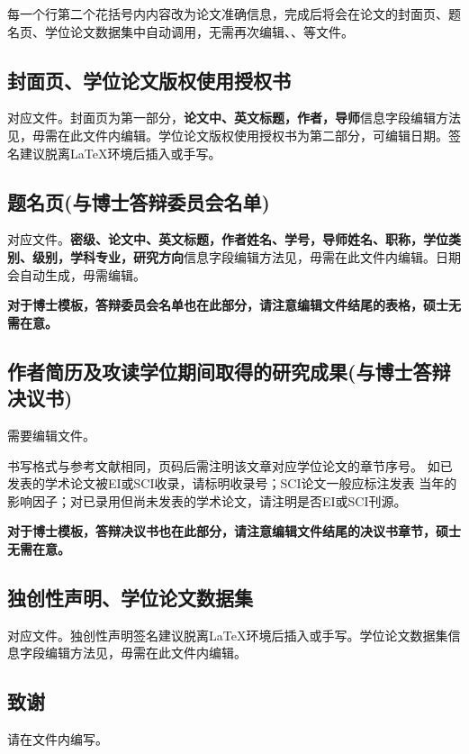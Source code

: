 每一个行第二个花括号内内容改为论文准确信息，完成后将会在论文的封面页、题名页、学位论文数据集中自动调用，无需再次编辑、、等文件。

\subsection{封面页、学位论文版权使用授权书}
对应文件。封面页为第一部分，\textbf{论文中、英文标题，作者，导师}信息字段编辑方法见，毋需在此文件内编辑。学位论文版权使用授权书为第二部分，可编辑日期。签名建议脱离\LaTeX{}环境后插入或手写。

\subsection{题名页(与博士答辩委员会名单)}
对应文件。\textbf{密级、论文中、英文标题，作者姓名、学号，导师姓名、职称，学位类别、级别，学科专业，研究方向}信息字段编辑方法见，毋需在此文件内编辑。日期会自动生成，毋需编辑。

\textbf{对于博士模板，答辩委员会名单也在此部分，请注意编辑文件结尾的表格，硕士无需在意。}

\subsection{作者简历及攻读学位期间取得的研究成果(与博士答辩决议书)}
需要编辑文件。

书写格式与参考文献相同，页码后需注明该文章对应学位论文的章节序号。
如已发表的学术论文被EI或SCI收录，请标明收录号；SCI论文一般应标注发表
当年的影响因子；对已录用但尚未发表的学术论文，请注明是否EI或SCI刊源。

\textbf{对于博士模板，答辩决议书也在此部分，请注意编辑文件结尾的决议书章节，硕士无需在意。}

\subsection{独创性声明、学位论文数据集}
对应文件。独创性声明签名建议脱离\LaTeX{}环境后插入或手写。学位论文数据集信息字段编辑方法见，毋需在此文件内编辑。

\subsection{致谢}
请在文件内编写。

